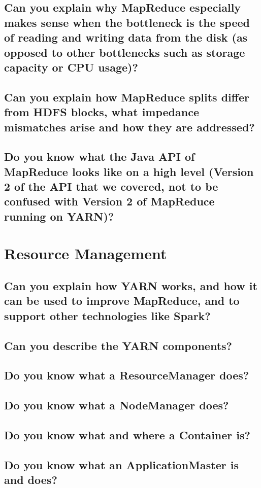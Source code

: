 \documentclass{article}
\begin{document}
\subsection{Can you explain why MapReduce especially makes sense when the bottleneck is the speed of reading and writing data from the disk (as opposed to other bottlenecks such as storage capacity or CPU usage)?}
\subsection{Can you explain how MapReduce splits differ from HDFS blocks, what impedance mismatches arise and how they are addressed?}
\subsection{Do you know what the Java API of MapReduce looks like on a high level (Version 2 of the API that we covered, not to be confused with Version 2 of MapReduce running on YARN)?}

\pagebreak

\section{Resource Management}
\subsection{Can you explain how YARN works, and how it can be used to improve MapReduce, and to support other technologies like Spark?}
\subsection{Can you describe the YARN components?}
\subsection{Do you know what a ResourceManager does?}
\subsection{Do you know what a NodeManager does?}
\subsection{Do you know what and where a Container is?}
\subsection{Do you know what an ApplicationMaster is and does?}
\end{document}
